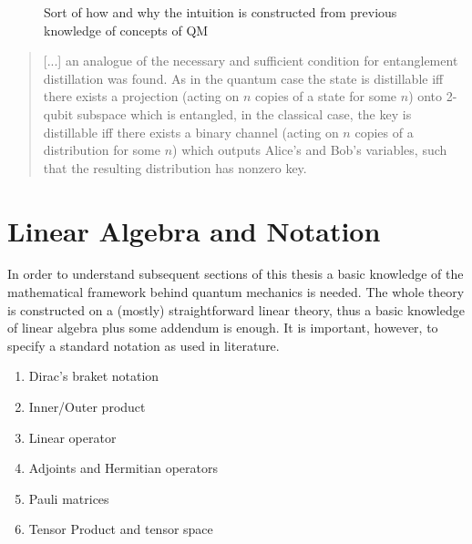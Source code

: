 	\begin{figure}[H]
		\centering
		
		\caption{Sort of how and why the intuition is constructed from previous knowledge of concepts of QM}
	\end{figure}
	
	\begin{quotation}
	[...] an analogue of the necessary and sufficient condition for entanglement distillation was found.
	As in the quantum case the state is distillable iff there exists a projection (acting on $n$ copies of a state for some $n$) onto 2-qubit subspace which is entangled, 
	in the classical case, the key is distillable iff there exists a binary channel (acting on $n$ copies of a distribution for some $n$) which outputs Alice's and Bob's variables, such that the resulting distribution has nonzero key.
	\cite{4H07}
	\end{quotation}
	
	
	\section{Linear Algebra and Notation}
	In order to understand subsequent sections of this thesis %
		a basic knowledge of the mathematical framework behind quantum mechanics is needed. The whole theory is constructed on a (mostly) straightforward linear theory, thus a basic knowledge of linear algebra plus some addendum is enough. It is important, however, to specify a standard notation as used in literature.
	
	\begin{enumerate}
	\item Dirac's braket notation
	\item Inner/Outer product
	\item Linear operator
	\item Adjoints and Hermitian operators
	\item Pauli matrices
	\item Tensor Product and tensor space
	\end{enumerate}
	
